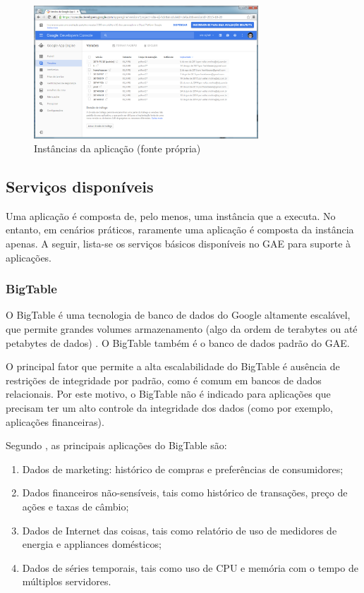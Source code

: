 \documentclass[12pt]{article}
\begin{document}
\begin{figure}
    \centering
    \includegraphics[width=0.75\textwidth]{versoes.png}
    \caption{Instâncias da aplicação (fonte própria)}
    \label{fig:versoes}
\end{figure}

\subsection{Serviços disponíveis}

Uma aplicação é composta de, pelo menos, uma instância que a executa. No
entanto, em cenários práticos, raramente uma aplicação é composta da instância
apenas. A seguir, lista-se os serviços básicos disponíveis no GAE para suporte
à aplicações.

\subsubsection{BigTable}

O BigTable é uma tecnologia de banco de dados do Google altamente escalável,
que permite grandes volumes armazenamento (algo da ordem de terabytes ou até
petabytes de dados) \cite{bigtable}. O BigTable também é o banco de dados
padrão do GAE.

O principal fator que permite a alta escalabilidade do BigTable é ausência de
restrições de integridade por padrão, como é comum em bancos de dados
relacionais. Por este motivo, o BigTable não é indicado para aplicações que
precisam ter um alto controle da integridade dos dados (como por exemplo,
aplicações financeiras).

Segundo \cite{bigtable}, as principais aplicações do BigTable são:
\begin{enumerate}
    \item Dados de marketing: histórico de compras e preferências de consumidores;
    \item Dados financeiros não-sensíveis, tais como histórico de transações, preço de ações e taxas de câmbio;
    \item Dados de Internet das coisas, tais como relatório de uso de medidores de energia e appliances domésticos;
    \item Dados de séries temporais, tais como uso de CPU e memória com o tempo de múltiplos servidores.
\end{enumerate}
\end{document}
